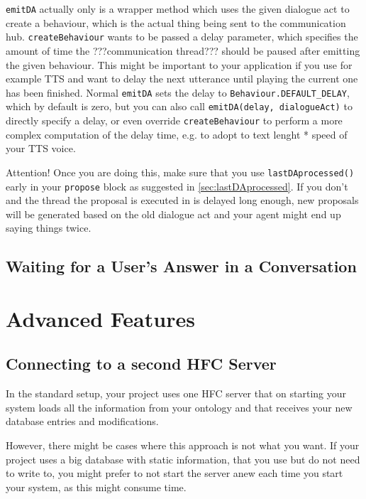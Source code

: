 \texttt{emitDA} actually only is a wrapper method which uses the given dialogue act to create a behaviour, which is the actual thing being sent to the communication hub. \texttt{createBehaviour} wants to be passed a delay parameter, which specifies the amount of time the ???communication thread??? 
should be paused after emitting the given behaviour. This might be important to your application if you use for example TTS and want to delay the next utterance until playing the current one has been finished.
Normal \texttt{emitDA} sets the delay to \texttt{Behaviour.DEFAULT\_DELAY}, which by default is zero, but you can also call \texttt{emitDA(delay, dialogueAct)} to directly specify a delay, or even override \texttt{createBehaviour} to perform a more complex computation of the delay time, e.g. to adopt to text lenght * speed of your TTS voice.

Attention! Once you are doing this, make sure that you use \texttt{lastDAprocessed()} early in your \texttt{propose} block as suggested in \ref{sec:lastDAprocessed}. If you don't and the thread the proposal is executed in is delayed long enough, new proposals will be generated based on the old dialogue act and your agent might end up saying things twice.

\subsection{Waiting for a User's Answer in a Conversation}


\section{Advanced Features}

\subsection{Connecting to a second HFC Server} \label{sec:2ndHfc}
In the standard setup, your \vonda project uses one HFC server that on starting your system loads all the information from your ontology and that receives your new database entries and modifications.

However, there might be cases where this approach is not what you want. If your project uses a big database with static information, that you use but do not need to write to, you might prefer to not start the server anew each time you start your system, as this might consume time.


